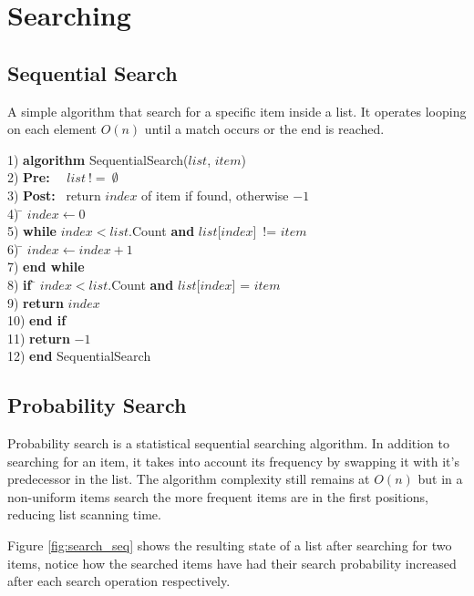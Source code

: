 \chapter{Searching}

\section{Sequential Search}
A simple algorithm that search for a specific item inside a list. It operates looping on each element $O(n)$ until a match occurs or the end is reached.

\begin{tabbing}
1) \textbf{alg}\= \textbf{orithm} SequentialSearch($list$, $item$)\\
2) \> \textbf{Pre:}~~ $list~!=~\emptyset$ \\
3) \> \textbf{Post:}~ return $index$ of item if found, otherwise $-1$ \\
4) \> \= $index \leftarrow 0$ \\
5) \> \textbf{whi}\= \textbf{le} $index < list$.Count  \textbf{and} $list$[$index$]~!= $item$ \\
6) \> \> \= $index \leftarrow index+1$ \\
7) \> \textbf{end while} \\
8) \> \textbf{if }\= $ index < list$.Count  \textbf{and} $list$[$index$] = $item$ \\
9) \> \> \textbf{return} $index$ \\
10)\> \textbf{end if} \\
11)\> \textbf{return} $-1$ \\ 
12) \textbf{end} SequentialSearch \\

\end{tabbing}

\section{Probability Search}
Probability search is a statistical sequential searching algorithm. In addition to searching for an item, it takes into account its frequency by swapping it with it's predecessor in the list. The algorithm complexity still remains at $O(n)$ but in a non-uniform items search the more frequent items are in the first positions, reducing list scanning time.

Figure \ref{fig:search_seq} shows the resulting state of a list after searching for two items, notice how the searched items have had their search probability increased after each search operation respectively.

